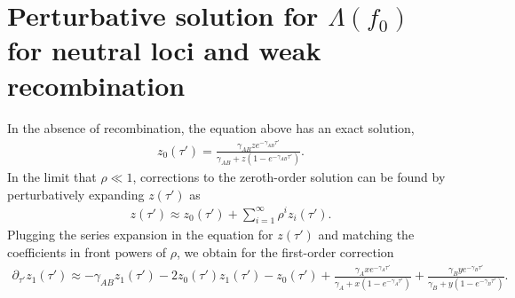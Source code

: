 \documentclass[11pt]{article}
\begin{document}
\section*{Perturbative solution for $\Lambda(f_0)$ for neutral loci and weak recombination}
In the absence of recombination, the equation above has an exact solution, 
\begin{align}
    z_0(\tau') = \frac{\gamma_{AB}ze^{-\gamma_{AB}\tau'}}{\gamma_{AB}+z(1-e^{-\gamma_{AB}\tau'})}.
\end{align}
In the limit that $\rho \ll 1$, corrections to the zeroth-order solution can be found by perturbatively expanding $z(\tau')$ as
\begin{align}\label{eq:z_series}
    z(\tau') \approx z_0(\tau') + \sum_{i=1}^{\infty} \rho^{i}z_i(\tau').
\end{align}
Plugging the series expansion in the equation for $z(\tau')$ and matching the coefficients in front powers of $\rho$, we obtain for the first-order correction
\begin{align}
        \partial_{\tau'}z_1(\tau') \approx -\gamma_{AB}z_1(\tau') -2z_0(\tau')z_1(\tau') - z_0(\tau') + \frac{\gamma_Axe^{-\gamma_A\tau'}}{\gamma_A+x(1-e^{-\gamma_A\tau'})} + \frac{\gamma_Bye^{-\gamma_B\tau'}}{\gamma_B+y(1-e^{-\gamma_B\tau'})}.
\end{align}
\end{document}
